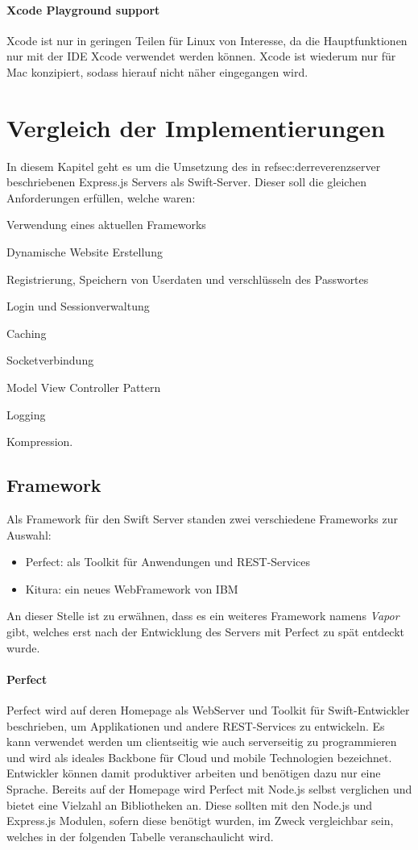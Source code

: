 \paragraph{Xcode Playground support}
Xcode ist nur in geringen Teilen für Linux von Interesse, da die Hauptfunktionen nur mit der IDE Xcode verwendet werden können. Xcode ist wiederum nur für Mac konzipiert, sodass hierauf nicht näher eingegangen wird.


\section{Vergleich der Implementierungen}

In diesem Kapitel geht es um die Umsetzung des in ref{sec:derreverenzserver} beschriebenen Express.js Servers als Swift-Server. Dieser soll die gleichen Anforderungen erfüllen, welche waren:
\begin{inparaenum}
	\item Verwendung eines aktuellen Frameworks
	\item Dynamische Website Erstellung
	\item Registrierung, Speichern von Userdaten und verschlüsseln des Passwortes
	\item Login und Sessionverwaltung
	\item Caching
	\item Socketverbindung
	\item Model View Controller Pattern
	\item Logging
	\item Kompression.
\end{inparaenum}

\subsection{Framework}
Als Framework für den Swift Server standen zwei verschiedene Frameworks zur Auswahl: 
\begin{itemize}
	\item Perfect: als Toolkit für Anwendungen und REST-Services
	\item Kitura: ein neues WebFramework von IBM
\end{itemize}
An dieser Stelle ist zu erwähnen, dass es ein weiteres Framework namens \textit{Vapor} gibt, welches erst nach der Entwicklung des Servers mit Perfect zu spät entdeckt wurde.

\paragraph{Perfect}
Perfect wird auf deren Homepage als WebServer und Toolkit für Swift-Entwickler beschrieben, um Applikationen und andere REST-Services zu entwickeln. Es kann verwendet werden um clientseitig wie auch serverseitig zu programmieren und wird als ideales Backbone für Cloud und mobile Technologien bezeichnet. Entwickler können damit produktiver arbeiten und benötigen dazu nur eine Sprache. Bereits auf der Homepage wird Perfect mit Node.js selbst verglichen und bietet eine Vielzahl an Bibliotheken an. Diese sollten mit den Node.js und Express.js Modulen, sofern diese benötigt wurden, im Zweck vergleichbar sein, welches in der folgenden Tabelle veranschaulicht wird.

